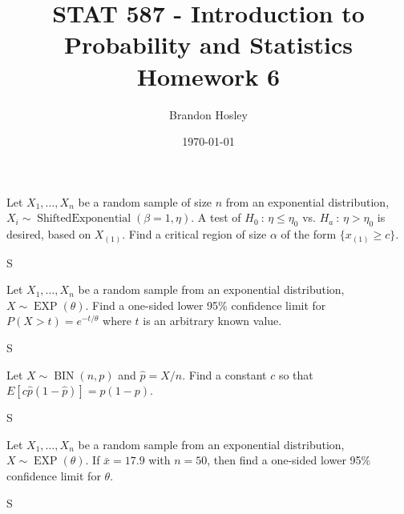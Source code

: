 \documentclass[answers]{exam}
\title{STAT 587 - Introduction to Probability and Statistics%
	\\ Homework 6}
\author{Brandon Hosley}
\date{\today}
\begin{document}
\maketitle
\begin{questions}

\question 
Let \(X_1,\dots,X_n\) be a random sample of size \(n\) from an exponential distribution, 
\(X_i\sim\operatorname{Shifted Exponential}(\beta=1,\eta)\). 
A test of \(H_0\ :\,\eta\leq\eta_0\) vs. \(H_a\ :\,\eta>\eta_0\)
is desired, based on \(X_{(1)}\). 
Find a critical region of size \(\alpha\) of the form \(\{x_{(1)}\geq c\}\).
\begin{solution}
	S
\end{solution}

\question 
Let \(X_1,\dots,X_n\) be a random sample from an exponential distribution, 
\(X\sim\operatorname{EXP}(\theta)\). 
Find a one-sided lower 95\% confidence limit for
\(P(X>t)=e^{-t/\theta}\) where \(t\) is an arbitrary known value.

%
% 

\begin{solution}
	S
\end{solution}

\question 
Let \(X\sim\operatorname{BIN}(n,p)\) and \(\hat{p}=X/n\).
Find a constant \(c\) so that
\(E\left[c\hat{p}(1-\hat{p})\right]=p(1-p)\).
\begin{solution}
	S
\end{solution}

\question 
Let \(X_1,\ldots,X_n\) be a random sample from an exponential distribution,
\(X\sim\operatorname{EXP}(\theta)\). 
If \(\bar{x}=17.9\) with \(n=50\), then find a one-sided lower 95\%
confidence limit for \(\theta\).
\begin{solution}
	S
\end{solution}


\end{questions}
\end{document}
